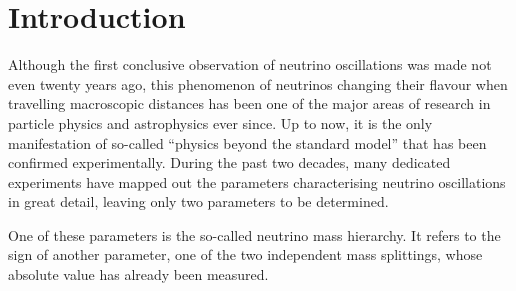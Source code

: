 \chapter{Introduction}
\label{sec:intro}

Although the first conclusive observation of neutrino oscillations was made not
even twenty years ago, this phenomenon of neutrinos changing their flavour when
travelling macroscopic distances has been one of the major areas of research in
particle physics and astrophysics ever since. Up to now, it is the only
manifestation of so-called ``physics beyond the standard model'' that has been
confirmed experimentally. During the past two decades, many dedicated
experiments have mapped out the parameters characterising neutrino oscillations
in great detail, leaving only two parameters to be determined.

One of these parameters is the so-called neutrino mass hierarchy. It refers to
the sign of another parameter, one of the two independent mass splittings,
whose absolute value has already been measured.